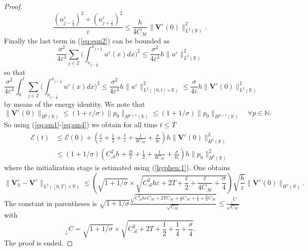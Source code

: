 \documentclass[a4paper,french,english,10pt]{article}
\newcommand\eps{\varepsilon}
\newcommand\V{\mathbf{V}}
\begin{document}
\begin{proof}
\begin{equation}
\frac{(u_{j-\frac12 }^{\eps})^2+(
u_{j+\frac12 }^{\eps})^2}{\eps} \leq  \frac{h}{4C_{\mathcal{M}}} \|\mathbf{V}^{\eps}(0)\|_{L^2(\mathbb{R})}^2.
\end{equation}
Finally the last term in (\ref{eq:eqn2}) can be bounded as %
$$
\frac{\sigma^2}{4\eps^3} \sum_{j\in
\mathbb{Z}}\bigg( {\int_{x_{j-\frac12}}^{x_{j+\frac12}}} u^{\eps}(x) dx \bigg)^2
\leq 
\frac{\sigma^2}{4\eps^3}
h \|  u^\eps  \|^2_{  L^2(\mathbb R) }
$$
so that
\begin{equation} \label{eq:sm4}
\frac{\sigma^2}{4\eps^3} 
\int_0^t 
 \sum_{j\in
\mathbb{Z}}\bigg( {\int_{x_{j-\frac12}}^{x_{j+\frac12}}} u^{\eps}(x) dx \bigg)^2
\leq 
\frac{\sigma^2}{4\eps^3}
h \| u^\eps  \|^2_{  L^2([0,t]\times \mathbb R) }
\leq 
\frac{\sigma}{4\eps}
h  \|\mathbf{V}^{\eps}(0)\|_{L^2(\mathbb{R})}^2
\end{equation}
by means of the energy identity.
We note that 
\begin{equation} \label{eq:v0p0} 
\| \V^{\eps}( 0)
\|_{H^p(\mathbb{R})} \leq (1+\eps /\sigma) \| p_0
\|_{H^{p+1}(\mathbb{R})}  \leq (1+1/\sigma) \| p_0
\|_{H^{p+1}(\mathbb{R})} \quad \forall p\in \mathbb N.
\end{equation}
 So using (\ref{eq:sm1}-\ref{eq:sm4}) we obtain for all time $t\leq T$
\begin{equation*}
  \begin{aligned}
\mathscr{E}(t) &\leq
\mathscr{E}(0)+
\left( \frac{t}{\eps}+\frac{1}2 + \frac{t}{\eps}+\frac1{4C_\mathcal M}+\frac{\sigma
}{4\eps}\right)
h
\|
 \V^{\eps}(0) \|_{H^1(\mathbb{R})}^2 \\
& \leq (1+1 /\sigma)
\left( C_\mathcal A ^2 h +  \frac{2 t}{\eps}+\frac{1}2 +\frac1{4C_\mathcal M}+\frac{\sigma
}{4\eps}\right)
h
\| p_0 \|_{H^2(\mathbb{R})}^2
\end{aligned}
\end{equation*}
where 
the initialization stage is estimated  using (\ref{hyphen:1}).
 One   obtains 
\begin{equation*}\label{esti1}
\|\V_h^{\eps}-\V^{\eps} \|_{L^2([0,T]\times \mathbb{R})}
\leq 
\left( 
\sqrt{1+1 /\sigma }
\times \sqrt{C_\mathcal A^2 h\eps + 2T + \frac{\eps}{2} + \frac{\eps}{4C_{\mathcal{M}}} + \frac{\sigma}{4} } \right) \sqrt{ \frac{h}{\eps}}
\| \V^{\eps}( 0)
\|_{H^1(\mathbb{R})}.
\end{equation*}
The constant in parentheses is
$
\sqrt{1+1 /\sigma } \frac{   
\sqrt{C_\mathcal A^2 h \eps C_\mathcal M + 2TC_\mathcal M + \frac{\eps}{2} C_\mathcal M
+ \frac{\eps}{4} + \frac{\sigma}{4} C_\mathcal M }
 }{\sqrt {C_\mathcal M}} 
\leq 
\frac{ ~_\downarrow C }{\sqrt {C_\mathcal M}}  $
 with 
 $$ ~_\downarrow C = \sqrt{1+1/\sigma} \times
\sqrt{C_\mathcal A^2 + 2T  + \frac{1}{2} 
+ \frac{1}{4} + \frac{\sigma}{4} }.
$$ 
The proof is ended. %
\end{proof}
\end{document}
